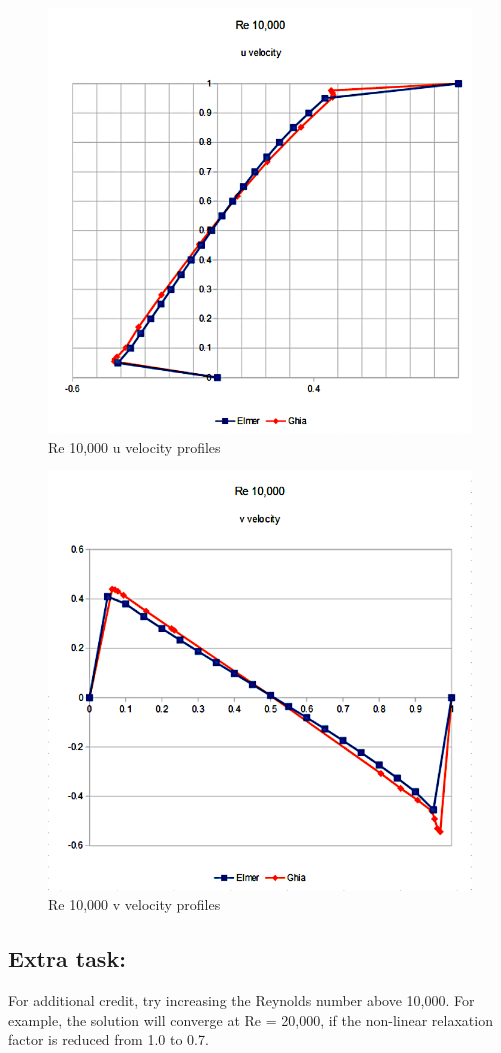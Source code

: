 \begin{figure}[H]
\centering
\includegraphics[scale=1.4]{Re10k_u}
\caption{Re 10,000 u velocity profiles}\label{fg:Re10k_u}
\end{figure} 

\begin{figure}[H]
\centering
\includegraphics[scale=1.4]{Re10k_v}
\caption{Re 10,000 v velocity profiles}\label{fg:Re10k_v}
\end{figure} 

\subsection*{Extra task:}

For additional credit, try increasing the Reynolds number above 10,000.  For example, the solution will converge at Re = 20,000, if the non-linear relaxation factor is reduced from 1.0 to 0.7.
\hfill